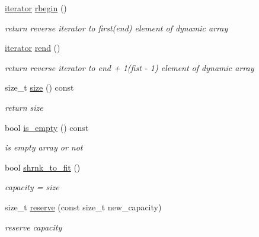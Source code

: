 \begin{DoxyCompactItemize}
\mbox{\label{classDyn__array_aeed6619e4e454972c86d3c5aee2b039d}} 
\hyperlink{classDyn__array_1_1iterator}{iterator} \hyperlink{classDyn__array_aeed6619e4e454972c86d3c5aee2b039d}{rbegin} ()
\begin{DoxyCompactList}\small\item\em return reverse iterator to first(end) element of dynamic array \end{DoxyCompactList}\item 
\mbox{\label{classDyn__array_a9b89ddcbd3c2ba21ee408827f61a98eb}} 
\hyperlink{classDyn__array_1_1iterator}{iterator} \hyperlink{classDyn__array_a9b89ddcbd3c2ba21ee408827f61a98eb}{rend} ()
\begin{DoxyCompactList}\small\item\em return reverse iterator to end + 1(fist -\/ 1) element of dynamic array \end{DoxyCompactList}\item 
\mbox{\label{classDyn__array_abe033b7d651c88c537692a4ac9815355}} 
size\+\_\+t \hyperlink{classDyn__array_abe033b7d651c88c537692a4ac9815355}{size} () const
\begin{DoxyCompactList}\small\item\em return size \end{DoxyCompactList}\item 
\mbox{\label{classDyn__array_a43a702b997406bcf8426c9b2ce413693}} 
bool \hyperlink{classDyn__array_a43a702b997406bcf8426c9b2ce413693}{is\+\_\+empty} () const
\begin{DoxyCompactList}\small\item\em is empty array or not \end{DoxyCompactList}\item 
\mbox{\label{classDyn__array_a021f3baee09ae4cc91a450d5f60cb318}} 
bool \hyperlink{classDyn__array_a021f3baee09ae4cc91a450d5f60cb318}{shrnk\+\_\+to\+\_\+fit} ()
\begin{DoxyCompactList}\small\item\em capacity = size \end{DoxyCompactList}\item 
size\+\_\+t \hyperlink{classDyn__array_a8cc1e876bc20ce13490898be4bdd7882}{reserve} (const size\+\_\+t new\+\_\+capacity)
\begin{DoxyCompactList}\small\item\em reserve capacity \end{DoxyCompactList}\item 

\end{DoxyCompactItemize}
